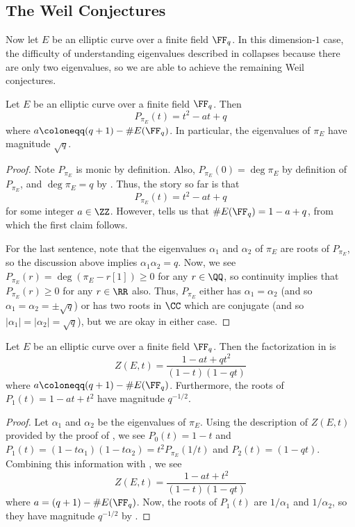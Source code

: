\documentclass{amsart}
\begin{document}
\subsection{The Weil Conjectures}
Now let $E$ be an elliptic curve over a finite field $\FF_q$. In this dimension-$1$ case, the difficulty of understanding eigenvalues described in  collapses because there are only two eigenvalues, so we are able to achieve the remaining Weil conjectures.
\begin{lemma} \label{lem:almost-rh}
	Let $E$ be an elliptic curve over a finite field $\FF_q$. Then
	\[P_{\pi_E}(t)=t^2-at+q\]
	where $a\coloneqq(q+1)-\#E(\FF_q)$. In particular, the eigenvalues of $\pi_E$ have magnitude $\sqrt q$.
\end{lemma}
\begin{proof}
	Note $P_{\pi_E}$ is monic by definition. Also, $P_{\pi_E}(0)=\deg\pi_E$ by definition of $P_{\pi_E}$, and $\deg\pi_E=q$ by . Thus, the story so far is that
	\[P_{\pi_E}(t)=t^2-at+q\]
	for some integer $a\in\ZZ$. However,  tells us that $\#E(\FF_q)=1-a+q$, from which the first claim follows.
	
	For the last sentence, note that the eigenvalues $\alpha_1$ and $\alpha_2$ of $\pi_E$ are roots of $P_{\pi_E}$, so the discussion above implies $\alpha_1\alpha_2=q$. Now, we see $P_{\pi_E}(r)=\deg(\pi_E-r[1])\ge0$ for any $r\in\QQ$, so continuity implies that $P_{\pi_E}(r)\ge0$ for any $r\in\RR$ also. Thus, $P_{\pi_E}$ either has $\alpha_1=\alpha_2$ (and so $\alpha_1=\alpha_2=\pm\sqrt q$) or has two roots in $\CC$ which are conjugate (and so $\left|\alpha_1\right|=\left|\alpha_2\right|=\sqrt q$), but we are okay in either case.
\end{proof}
\begin{theorem} \label{thm:rh}
	Let $E$ be an elliptic curve over a finite field $\FF_q$. Then the factorization in  is
	\[Z(E,t)=\frac{1-at+qt^2}{(1-t)(1-qt)}\]
	where $a\coloneqq (q+1)-\#E(\FF_q)$. Furthermore, the roots of $P_1(t)=1-at+t^2$ have magnitude $q^{-1/2}$.
\end{theorem}
\begin{proof}
	Let $\alpha_1$ and $\alpha_2$ be the eigenvalues of $\pi_E$. Using the description of $Z(E,t)$ provided by the proof of , we see $P_0(t)=1-t$ and $P_1(t)=(1-t\alpha_1)(1-t\alpha_2)=t^2P_{\pi_E}(1/t)$ and $P_2(t)=(1-qt)$. Combining this information with , we see
	\[Z(E,t)=\frac{1-at+t^2}{(1-t)(1-qt)}\]
	where $a=(q+1)-\#E(\FF_q)$. Now, the roots of $P_1(t)$ are $1/\alpha_1$ and $1/\alpha_2$, so they have magnitude $q^{-1/2}$ by .
\end{proof}
\end{document}
